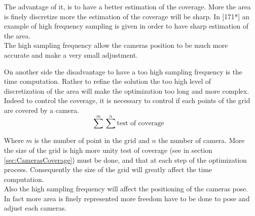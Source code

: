 %
The advantage of it, is to have a better estimation of the coverage. More the area is finely discretize more the estimation of the coverage will be sharp. In [171*] an example of high frequency sampling is given in order to have sharp estimation of the area. \\
The high sampling frequency allow the cameras position to be much more accurate and make a very small adjustment.


On another side the disadvantage to have a too high sampling frequency is the time computation. Rather to refine the solution the too high level of discretization of the area will make the optimization too long and more complex. Indeed to control the coverage, it is necessary to control if each points of the grid are covered by a camera.  
\begin{equation} 
	\sum^m \sum^n \mbox{test of coverage}
\end{equation}

Where $m$ is the number of point in the grid and $n$ the number of camera. 
 More the size of the grid is high more unity test of coverage (see in section \ref{sec:CamerasCoverage}) must be done, and that at each step of the optimization process.  Consequently the size of the grid will greatly affect the time computation.  \\
Also the high sampling frequency will affect the positioning of the cameras pose. In fact more area is finely represented more freedom have to be done to pose and adjust each cameras. 



